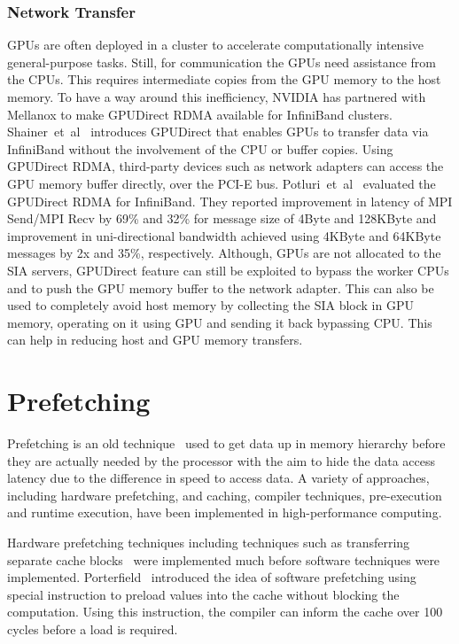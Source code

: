 \subsubsection{Network Transfer}
GPUs are often deployed in a cluster to accelerate computationally intensive
general-purpose tasks. Still, for communication the GPUs need assistance from the CPUs.
This requires intermediate copies from the GPU memory to the host memory. To have
a way around this inefficiency, NVIDIA has partnered with Mellanox to make GPUDirect
RDMA available for InfiniBand clusters. Shainer~et~al~\cite{Shainer2011} introduces
GPUDirect that enables GPUs to transfer data via InfiniBand without the  involvement
of the CPU or buffer copies. Using GPUDirect RDMA, third-party devices such as
network adapters can access the GPU memory buffer directly, over the PCI-E bus.
Potluri~et~al~\cite{Potluri:2013:EIM:2570457.2571010} evaluated the GPUDirect RDMA for InfiniBand. They reported
improvement in latency of MPI Send/MPI Recv by 69\% and 32\% for message size of
4Byte and 128KByte and improvement in uni-directional bandwidth achieved using
4KByte and 64KByte messages by 2x and 35\%, respectively.
Although, GPUs are not allocated to the SIA servers, GPUDirect feature can still
be exploited to bypass the worker CPUs and to push the GPU memory buffer to the network
adapter. This can also be used to completely avoid host memory by collecting the
SIA block in GPU memory, operating on it using GPU and sending it back bypassing
CPU. This can help in reducing host and GPU memory transfers.

\section{Prefetching}
Prefetching is an old technique~\cite{anacker68}\cite{Smith1982}\cite{Vanderwiel2000}
used to get data up in memory hierarchy before they are actually needed by the processor
with the aim to hide the data access latency due to the difference in speed to access
data. A variety of approaches, including hardware prefetching, and caching, compiler
techniques, pre-execution and runtime execution, have been implemented in
high-performance computing.

Hardware prefetching techniques including techniques such as transferring separate
cache blocks~\cite{Smith1978} were implemented much before software techniques were
implemented. Porterfield~\cite{Porterfield1989} introduced the idea of software prefetching
using special instruction to preload values into the cache without blocking the
computation. Using this instruction, the compiler can inform the cache over 100
cycles before a load is required.

